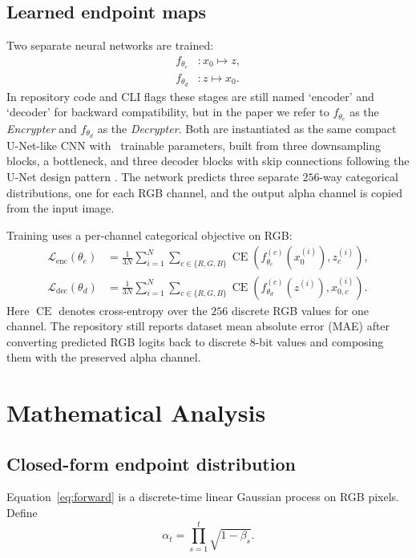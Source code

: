 \documentclass[11pt]{article}
\begin{document}
\subsection{Learned endpoint maps}
Two separate neural networks are trained:
\begin{align}
f_{\theta_e} &: x_0 \mapsto z, \\
f_{\theta_d} &: z \mapsto x_0.
\end{align}
In repository code and CLI flags these stages are still named `encoder' and `decoder' for backward compatibility, but in the paper we refer to $f_{\theta_e}$ as the \emph{Encrypter} and $f_{\theta_d}$ as the \emph{Decrypter}. Both are instantiated as the same compact U-Net-like CNN with \ModelParamCount\ trainable parameters, built from three downsampling blocks, a bottleneck, and three decoder blocks with skip connections following the U-Net design pattern \citep{ronneberger2015unet}. The network predicts three separate $256$-way categorical distributions, one for each RGB channel, and the output alpha channel is copied from the input image.

Training uses a per-channel categorical objective on RGB:
\begin{align}
\mathcal{L}_{\text{enc}}(\theta_e) &= \frac{1}{3N}\sum_{i=1}^{N} \sum_{c \in \{R,G,B\}} \operatorname{CE}\!\left(f_{\theta_e}^{(c)}(x_0^{(i)}), z_c^{(i)} \right), \\
\mathcal{L}_{\text{dec}}(\theta_d) &= \frac{1}{3N}\sum_{i=1}^{N} \sum_{c \in \{R,G,B\}} \operatorname{CE}\!\left(f_{\theta_d}^{(c)}(z^{(i)}), x_{0,c}^{(i)} \right).
\end{align}
Here $\operatorname{CE}$ denotes cross-entropy over the $256$ discrete RGB values for one channel. The repository still reports dataset mean absolute error (MAE) after converting predicted RGB logits back to discrete $8$-bit values and composing them with the preserved alpha channel.

\section{Mathematical Analysis}
\subsection{Closed-form endpoint distribution}
Equation~\eqref{eq:forward} is a discrete-time linear Gaussian process on RGB pixels. Define
\begin{equation}
\alpha_t = \prod_{s=1}^{t} \sqrt{1-\beta_s}.
\end{equation}
\end{document}
